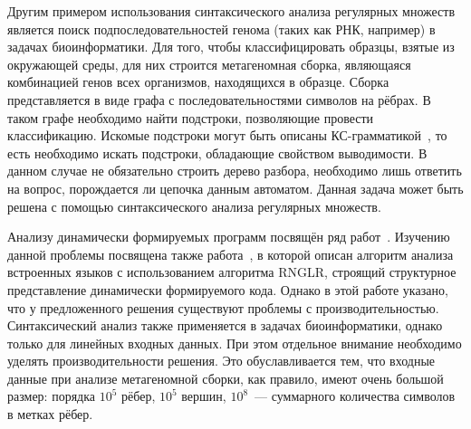 Другим примером использования синтаксического анализа регулярных множеств является поиск подпоследовательностей генома (таких как РНК, например) в задачах биоинформатики. Для того, чтобы классифицировать образцы, взятые из окружающей среды, для них строится метагеномная сборка, являющаяся комбинацией генов всех организмов, находящихся в образце. Сборка представляется в виде графа с последовательностями символов на рёбрах. В таком графе необходимо найти подстроки, позволяющие провести классификацию. Искомые подстроки могут быть описаны КС-грамматикой~\cite{Anderson}, то есть необходимо искать подстроки, обладающие свойством выводимости. В данном случае не обязательно строить дерево разбора, необходимо лишь ответить на вопрос, порождается ли цепочка данным автоматом. Данная задача может быть решена с помощью синтаксического анализа регулярных множеств.

Анализу динамически формируемых программ посвящён ряд работ~\cite{LrAbstract1, LrAbstract2, LRAbstractParsingSema}.  Изучению данной проблемы посвящена также работа~\cite{RelaxedARNGLR}, в которой описан алгоритм анализа встроенных языков с использованием алгоритма RNGLR, строящий структурное представление динамически формируемого кода. Однако в этой работе указано, что у предложенного решения существуют проблемы с производительностью. Синтаксический анализ также применяется в задачах биоинформатики, однако только для линейных входных данных. При этом отдельное внимание необходимо уделять производительности решения. Это обуславливается тем, что входные данные при анализе метагеномной сборки, как правило, имеют очень большой размер: порядка $10^5$ рёбер, $10^5$ вершин, $10^8$~--- суммарного количества символов в метках рёбер. 
